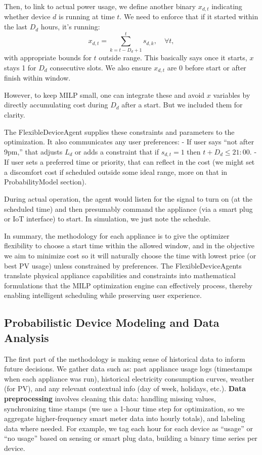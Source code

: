 \documentclass[12pt,a4paper]{article}
\begin{document}
Then, to link to actual power usage, we define another binary $x_{d,t}$ indicating whether device $d$ is running at time $t$. We need to enforce that if it started within the last $D_d$ hours, it’s running:
\[
x_{d,t} = \sum_{k=t-D_d+1}^{t} s_{d,k}, \quad \forall t, 
\]
with appropriate bounds for $t$ outside range. This basically says once it starts, $x$ stays 1 for $D_d$ consecutive slots. We also ensure $x_{d,t}$ are 0 before start or after finish within window.

However, to keep MILP small, one can integrate these and avoid $x$ variables by directly accumulating cost during $D_d$ after a start. But we included them for clarity.

The FlexibleDeviceAgent supplies these constraints and parameters to the optimization. It also communicates any user preferences:
- If user says “not after 9pm,” that adjusts $L_d$ or adds a constraint that if $s_{d,t}=1$ then $t+D_d \le 21:00$.
- If user sets a preferred time or priority, that can reflect in the cost (we might set a discomfort cost if scheduled outside some ideal range, more on that in ProbabilityModel section).

During actual operation, the agent would listen for the signal to turn on (at the scheduled time) and then presumably command the appliance (via a smart plug or IoT interface) to start. In simulation, we just note the schedule.

In summary, the methodology for each appliance is to give the optimizer flexibility to choose a start time within the allowed window, and in the objective we aim to minimize cost so it will naturally choose the time with lowest price (or best PV usage) unless constrained by preferences. The FlexibleDeviceAgents translate physical appliance capabilities and constraints into mathematical formulations that the MILP optimization engine can effectively process, thereby enabling intelligent scheduling while preserving user experience.

\subsection{Probabilistic Device Modeling and Data Analysis}
\label{sec:prob_device_model}

The first part of the methodology is making sense of historical data to inform future decisions. We gather data such as: past appliance usage logs (timestamps when each appliance was run), historical electricity consumption curves, weather (for PV), and any relevant contextual info (day of week, holidays, etc.). \textbf{Data preprocessing} involves cleaning this data: handling missing values, synchronizing time stamps (we use a 1-hour time step for optimization, so we aggregate higher-frequency smart meter data into hourly totals), and labeling data where needed. For example, we tag each hour for each device as ``usage'' or ``no usage'' based on sensing or smart plug data, building a binary time series per device.
\end{document}
